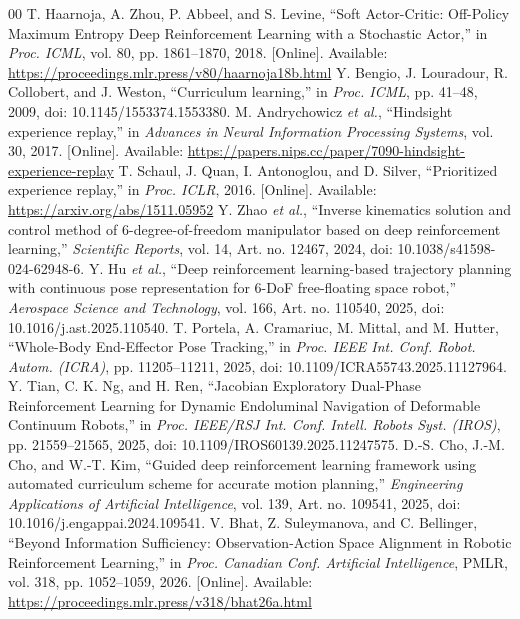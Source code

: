 \documentclass[conference]{IEEEtran}
\begin{document}
\begin{thebibliography}{00}
 T. Haarnoja, A. Zhou, P. Abbeel, and S. Levine, ``Soft Actor-Critic: Off-Policy Maximum Entropy Deep Reinforcement Learning with a Stochastic Actor,'' in \emph{Proc. ICML}, vol. 80, pp. 1861--1870, 2018. [Online]. Available: \url{https://proceedings.mlr.press/v80/haarnoja18b.html}
 Y. Bengio, J. Louradour, R. Collobert, and J. Weston, ``Curriculum learning,'' in \emph{Proc. ICML}, pp. 41--48, 2009, doi: 10.1145/1553374.1553380.
 M. Andrychowicz \emph{et al.}, ``Hindsight experience replay,'' in \emph{Advances in Neural Information Processing Systems}, vol. 30, 2017. [Online]. Available: \url{https://papers.nips.cc/paper/7090-hindsight-experience-replay}
 T. Schaul, J. Quan, I. Antonoglou, and D. Silver, ``Prioritized experience replay,'' in \emph{Proc. ICLR}, 2016. [Online]. Available: \url{https://arxiv.org/abs/1511.05952}
 Y. Zhao \emph{et al.}, ``Inverse kinematics solution and control method of 6-degree-of-freedom manipulator based on deep reinforcement learning,'' \emph{Scientific Reports}, vol. 14, Art. no. 12467, 2024, doi: 10.1038/s41598-024-62948-6.
 Y. Hu \emph{et al.}, ``Deep reinforcement learning-based trajectory planning with continuous pose representation for 6-DoF free-floating space robot,'' \emph{Aerospace Science and Technology}, vol. 166, Art. no. 110540, 2025, doi: 10.1016/j.ast.2025.110540.
 T. Portela, A. Cramariuc, M. Mittal, and M. Hutter, ``Whole-Body End-Effector Pose Tracking,'' in \emph{Proc. IEEE Int. Conf. Robot. Autom. (ICRA)}, pp. 11205--11211, 2025, doi: 10.1109/ICRA55743.2025.11127964.
 Y. Tian, C. K. Ng, and H. Ren, ``Jacobian Exploratory Dual-Phase Reinforcement Learning for Dynamic Endoluminal Navigation of Deformable Continuum Robots,'' in \emph{Proc. IEEE/RSJ Int. Conf. Intell. Robots Syst. (IROS)}, pp. 21559--21565, 2025, doi: 10.1109/IROS60139.2025.11247575.
 D.-S. Cho, J.-M. Cho, and W.-T. Kim, ``Guided deep reinforcement learning framework using automated curriculum scheme for accurate motion planning,'' \emph{Engineering Applications of Artificial Intelligence}, vol. 139, Art. no. 109541, 2025, doi: 10.1016/j.engappai.2024.109541.
 V. Bhat, Z. Suleymanova, and C. Bellinger, ``Beyond Information Sufficiency: Observation-Action Space Alignment in Robotic Reinforcement Learning,'' in \emph{Proc. Canadian Conf. Artificial Intelligence}, PMLR, vol. 318, pp. 1052--1059, 2026. [Online]. Available: \url{https://proceedings.mlr.press/v318/bhat26a.html}

\end{thebibliography}
\end{document}
